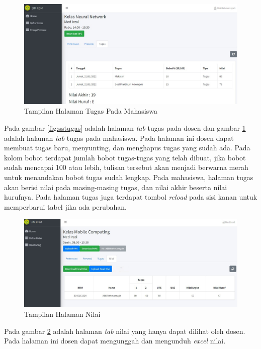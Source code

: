 \begin{figure}[h!]
	\centering
	\includegraphics[width=1\textwidth]{gambar/ss/tugas_mhs}
	\caption{Tampilan Halaman Tugas Pada Mahasiswa}
	\label{fig:sstugasmhs}
\end{figure}

Pada gambar \ref{fig:sstugas} adalah halaman \textit{tab} tugas pada dosen dan gambar \ref{fig:sstugasmhs} adalah halaman \textit{tab} tugas pada mahasiswa. Pada halaman ini dosen dapat membuat tugas baru, menyunting, dan menghapus tugas yang sudah ada. Pada kolom bobot terdapat jumlah bobot tugas-tugas yang telah dibuat, jika bobot sudah mencapai 100 atau lebih, tulisan tersebut akan menjadi berwarna merah untuk menandakan bobot tugas sudah lengkap. Pada mahasiswa, halaman tugas akan berisi nilai pada masing-masing tugas, dan nilai akhir beserta nilai hurufnya. Pada halaman tugas juga terdapat tombol \textit{reload} pada sisi kanan untuk memperbarui tabel jika ada perubahan.

\begin{figure}[h!]
	\centering
	\includegraphics[width=1\textwidth]{gambar/ss/nilai}
	\caption{Tampilan Halaman Nilai}
	\label{fig:ssnilai}
\end{figure}

Pada gambar \ref{fig:ssnilai} adalah halaman \textit{tab} nilai yang hanya dapat dilihat oleh dosen. Pada halaman ini dosen dapat mengunggah dan mengunduh \textit{excel} nilai.

